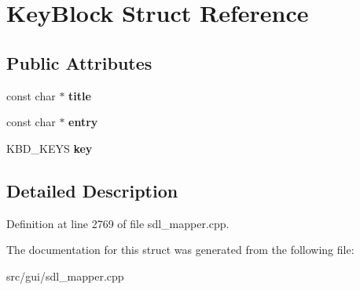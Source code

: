 \hypertarget{structKeyBlock}{\section{Key\-Block Struct Reference}
\label{structKeyBlock}
}
\subsection*{Public Attributes}
\begin{DoxyCompactItemize}
\item 
\hypertarget{structKeyBlock_aa8f0583008d486e791f4712f7206c256}{const char $\ast$ {\bfseries title}}\label{structKeyBlock_aa8f0583008d486e791f4712f7206c256}

\item 
\hypertarget{structKeyBlock_a025404788705e95fb7d9484ee068dd50}{const char $\ast$ {\bfseries entry}}\label{structKeyBlock_a025404788705e95fb7d9484ee068dd50}

\item 
\hypertarget{structKeyBlock_ad7f402307cea47b73666058183ded837}{K\-B\-D\-\_\-\-K\-E\-Y\-S {\bfseries key}}\label{structKeyBlock_ad7f402307cea47b73666058183ded837}

\end{DoxyCompactItemize}


\subsection{Detailed Description}


Definition at line 2769 of file sdl\-\_\-mapper.\-cpp.



The documentation for this struct was generated from the following file\-:\begin{DoxyCompactItemize}
\item 
src/gui/sdl\-\_\-mapper.\-cpp\end{DoxyCompactItemize}
